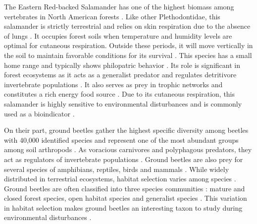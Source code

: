 The Eastern Red-backed Salamander has one of the highest biomass among vertebrates in North American forests \citep{Burton1975Salamanderpopulations,Petranka1993Effectstimber,semlitschAbundanceBiomassProduction2014a}. 
Like other Plethodontidae, this salamander is strictly terrestrial and relies on skin respiration due to the absence of lungs \citep{Heatwole1961Relationsubstrate}. 
It occupies forest soils when temperature and humidity levels are optimal for cutaneous respiration. 
Outside these periods, it will move vertically in the soil to maintain favorable conditions for its survival \citep{Grizzell1949HibernationSite}. 
This species has a small home range and typically shows philopatric behavior \citep{Yurewicz2004ResourceAvailability}. 
Its role is significant in forest ecosystems as it acts as a generalist predator and regulates detritivore invertebrate populations \citep{Burton1975Energyflow,Walton2013Topdownregulation,Hickerson2017Easternredbacked}. 
It also serves as prey in trophic networks and constitutes a rich energy food source \citep{Burton1975Energyflow,Pough1987abundancesalamanders}. 
Due to its cutaneous respiration, this salamander is highly sensitive to environmental disturbances \citep{Welsh2001caseusing} and is commonly used as a bioindicator \citep{Heatwole1962EnvironmentalFactors,gibbsDistributionWoodlandAmphibians1998,Baecher2018Environmentalgradients,Mossman2019Twosalamander}.

On their part, ground beetles gather the highest specific diversity among beetles with 40,000 identified species and represent one of the most abundant groups among soil arthropods \citep{Erwin1985taxonpulse,loveiEcologyBehaviorGround1996,Rochefort2006GroundBeetle}. 
As voracious carnivores and polyphagous predators, they act as regulators of invertebrate populations \citep{loveiEcologyBehaviorGround1996}. 
Ground beetles are also prey for several species of amphibians, reptiles, birds and mammals \citep{loveiEcologyBehaviorGround1996}. 
While widely distributed in terrestrial ecosystems, habitat selection varies among species \citep{Larochelle2003naturalhistory}. 
Ground beetles are often classified into three species communities : mature and closed forest species, open habitat species and generalist species \citep{Niemela2007effectsforestry}. 
This variation in habitat selection makes ground beetles an interesting taxon to study during environmental disturbances \citep{bouchardBeetleCommunityResponse2016b,Luff1992Classificationprediction,Rainio2003Groundbeetles,Work2008Evaluationcarabid}.

